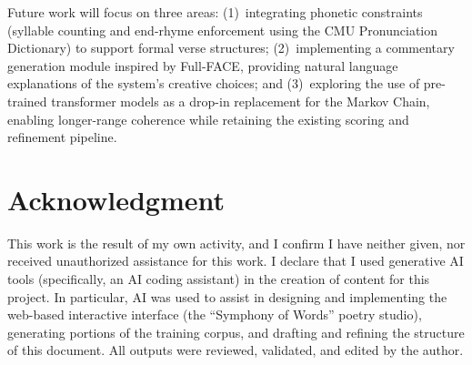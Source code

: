 \documentclass[conference]{IEEEtran}
\begin{document}
Future work will focus on three areas: (1)~integrating phonetic constraints (syllable counting and end-rhyme enforcement using the CMU Pronunciation Dictionary) to support formal verse structures; (2)~implementing a commentary generation module inspired by Full-FACE, providing natural language explanations of the system's creative choices; and (3)~exploring the use of pre-trained transformer models as a drop-in replacement for the Markov Chain, enabling longer-range coherence while retaining the existing scoring and refinement pipeline.


\section*{Acknowledgment}

This work is the result of my own activity, and I confirm I have neither given, nor received unauthorized assistance for this work. I declare that I used generative AI tools (specifically, an AI coding assistant) in the creation of content for this project. In particular, AI was used to assist in designing and implementing the web-based interactive interface (the ``Symphony of Words'' poetry studio), generating portions of the training corpus, and drafting and refining the structure of this document. All outputs were reviewed, validated, and edited by the author.
\end{document}

